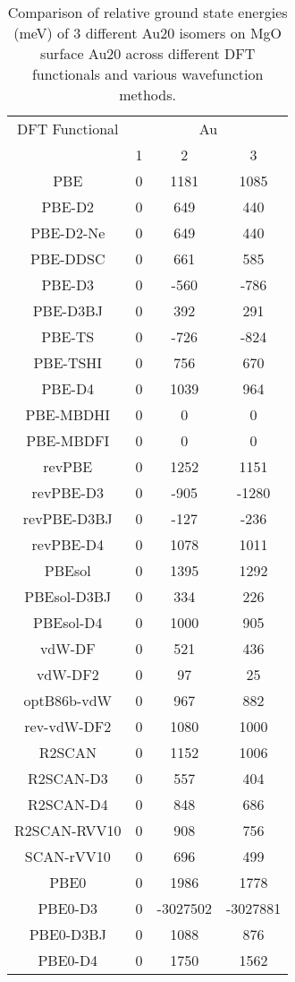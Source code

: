 \begin{table}[ht]
\centering
\caption{Comparison of relative ground state energies (meV) of 3 different Au20 isomers on MgO surface Au20 across different DFT functionals and various wavefunction methods.}
\begin{tabular}{cccc}
\hline\hline
DFT Functional & \multicolumn{3}{c}{Au} \\ 
\cline{2-4}
 & 1 & 2 & 3 \\ \hline
PBE & 0 & 1181 & 1085 \\ 
PBE-D2 & 0 & 649 & 440 \\ 
PBE-D2-Ne & 0 & 649 & 440 \\ 
PBE-DDSC & 0 & 661 & 585 \\ 
PBE-D3 & 0 & -560 & -786 \\ 
PBE-D3BJ & 0 & 392 & 291 \\ 
PBE-TS & 0 & -726 & -824 \\ 
PBE-TSHI & 0 & 756 & 670 \\ 
PBE-D4 & 0 & 1039 & 964 \\ 
PBE-MBDHI & 0 & 0 & 0 \\ 
PBE-MBDFI & 0 & 0 & 0 \\ 
revPBE & 0 & 1252 & 1151 \\ 
revPBE-D3 & 0 & -905 & -1280 \\ 
revPBE-D3BJ & 0 & -127 & -236 \\ 
revPBE-D4 & 0 & 1078 & 1011 \\ 
PBEsol & 0 & 1395 & 1292 \\ 
PBEsol-D3BJ & 0 & 334 & 226 \\ 
PBEsol-D4 & 0 & 1000 & 905 \\ 
vdW-DF & 0 & 521 & 436 \\ 
vdW-DF2 & 0 & 97 & 25 \\ 
optB86b-vdW & 0 & 967 & 882 \\ 
rev-vdW-DF2 & 0 & 1080 & 1000 \\ 
R2SCAN & 0 & 1152 & 1006 \\ 
R2SCAN-D3 & 0 & 557 & 404 \\ 
R2SCAN-D4 & 0 & 848 & 686 \\ 
R2SCAN-RVV10 & 0 & 908 & 756 \\ 
SCAN-rVV10 & 0 & 696 & 499 \\ 
PBE0 & 0 & 1986 & 1778 \\ 
PBE0-D3 & 0 & -3027502 & -3027881 \\ 
PBE0-D3BJ & 0 & 1088 & 876 \\ 
PBE0-D4 & 0 & 1750 & 1562 \\ 

\end{tabular}
\end{table}
